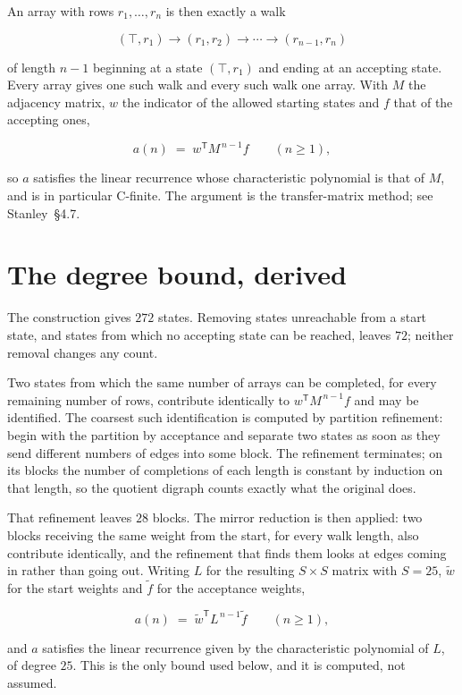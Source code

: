 \documentclass[11pt]{article}
\theoremstyle{definition}
\begin{document}
An array with rows $r_1,\dots,r_n$ is then exactly a walk

\[(\top,r_1) \to (r_1,r_2) \to \cdots \to (r_{n-1},r_n)\]

of length $n-1$ beginning at a state $(\top,r_1)$ and ending at an accepting state. Every array gives one such walk and every such walk one array. With $M$ the adjacency matrix, $w$ the indicator of the allowed starting states and $f$ that of the accepting ones,

\[a(n) \;=\; w^{\mathsf T} M^{\,n-1} f \qquad (n \ge 1),\]

so $a$ satisfies the linear recurrence whose characteristic polynomial is that of $M$, and is in particular C-finite. The argument is the transfer-matrix method; see Stanley~\S4.7.

\section{The degree bound, derived}

The construction gives $272$ states. Removing states unreachable from a start state, and states from which no accepting state can be reached, leaves $72$; neither removal changes any count.

Two states from which the same number of arrays can be completed, for every remaining number of rows, contribute identically to $w^{\mathsf T}M^{\,n-1}f$ and may be identified. The coarsest such identification is computed by partition refinement: begin with the partition by acceptance and separate two states as soon as they send different numbers of edges into some block. The refinement terminates; on its blocks the number of completions of each length is constant by induction on that length, so the quotient digraph counts exactly what the original does.

That refinement leaves $28$ blocks. The mirror reduction is then applied: two blocks receiving the same weight from the start, for every walk length, also contribute identically, and the refinement that finds them looks at edges coming in rather than going out. Writing $L$ for the resulting $S \times S$ matrix with $S = 25$, $\tilde w$ for the start weights and $\tilde f$ for the acceptance weights,

\[a(n) \;=\; \tilde w^{\mathsf T} L^{\,n-1} \tilde f \qquad (n \ge 1),\]

and $a$ satisfies the linear recurrence given by the characteristic polynomial of $L$, of degree $25$. This is the only bound used below, and it is computed, not assumed.
\end{document}
